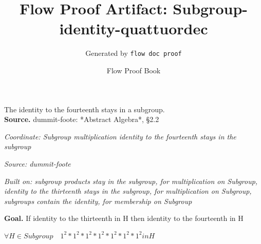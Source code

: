 \documentclass[11pt]{article}
\title{Flow Proof Artifact: Subgroup-identity-quattuordec}
\author{Generated by \texttt{flow doc proof}}
\date{Flow Proof Book}
\theoremstyle{definition}
\begin{document}
\maketitle
The identity to the fourteenth stays in a subgroup.\\[0.5em]
\textbf{Source.} dummit-foote: *Abstract Algebra*, §2.2\\[0.5em]
\bigskip
{}\par
\smallskip\noindent\textit{Coordinate: Subgroup \cdot multiplication \cdot identity to the fourteenth stays in the subgroup}\par
\smallskip\noindent\textit{Source: dummit-foote}\par
\smallskip\noindent\textit{Built on: subgroup products stay in the subgroup, for multiplication on Subgroup, identity to the thirteenth stays in the subgroup, for multiplication on Subgroup, subgroups contain the identity, for membership on Subgroup}\par
\medskip
\noindent\textbf{Goal.} If identity to the thirteenth in H then identity to the fourteenth in H\par
\noindent$\displaystyle \forall H \in Subgroup\quad 1^{2} * 1^{2} * 1^{2} * 1^{2} * 1^{2} * 1^{2} * 1^{2} in H$\par
\medskip
\noindent
\end{document}
